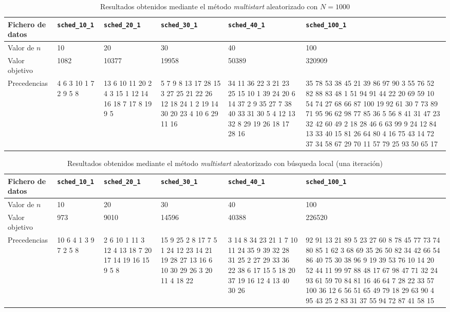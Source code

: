 \documentclass[a4paper,11pt]{article}
\begin{document}
\begin{table}[!htbp]
\label{tb:results_multistart_1000}
\centering\scriptsize
\begin{tabularx}{\textwidth}{|X|X|X|X|X|X|}
\hline
Fichero de datos	& \texttt{sched\_10\_1}	& \texttt{sched\_20\_1}	& \texttt{sched\_30\_1}	& \texttt{sched\_40\_1}	& \texttt{sched\_100\_1}	\\ \hline
Valor de $n$        & 10    & 20    & 30    & 40    & 100   \\ \hline
Valor objetivo      & 1082  & 10377 & 19958 & 50389 & 320909    \\ \hline
Precedencias        & 4 6 3 10 1 7 2 9 5 8  & 13 6 10 11 20 2 4 3 15 1 12 14 16 18 7 17 8 19 9 5    & 5 7 9 8 13 17 28 15 3 27 25 21 22 26 12 18 24 1 2 19 14 30 20 23 4 10 6 29 11 16  & 34 11 36 22 3 21 23 25 15 10 1 39 24 20 6 14 37 2 9 35 27 7 38 40 33 31 30 5 4 12 13 32 8 29 19 26 18 17 28 16    & 35 78 53 38 45 21 39 86 97 90 3 55 76 52 82 88 83 48 1 51 94 91 44 22 20 69 59 10 54 74 27 68 66 87 100 19 92 61 30 7 73 89 71 95 96 62 98 77 85 36 5 56 8 41 31 47 23 32 42 60 49 2 18 28 46 6 63 99 9 24 12 84 13 33 40 15 81 26 64 80 4 16 75 43 14 72 37 34 58 67 29 70 11 57 79 25 93 50 65 17   \\ \hline
\end{tabularx}
\caption{Resultados obtenidos mediante el método \textit{multistart} aleatorizado con ${N=1000}$}
\end{table}

\begin{table}[!htbp]
\label{tb:results_multistart_local_1}
\centering\scriptsize
\begin{tabularx}{\textwidth}{|X|X|X|X|X|X|}
\hline
Fichero de datos	& \texttt{sched\_10\_1}	& \texttt{sched\_20\_1}	& \texttt{sched\_30\_1}	& \texttt{sched\_40\_1}	& \texttt{sched\_100\_1}	\\ \hline
Valor de $n$        & 10    & 20    & 30    & 40    & 100   \\ \hline
Valor objetivo      & 973   & 9010  & 14596 & 40388 & 226520    \\ \hline
Precedencias        & 10 6 4 1 3 9 7 2 5 8  & 2 6 10 1 11 3 12 4 13 18 7 20 17 14 19 16 15 9 5 8    & 15 9 25 2 8 17 7 5 1 24 12 23 14 21 19 28 27 13 16 6 10 30 29 26 3 20 11 4 18 22  & 3 14 8 34 23 21 1 7 10 11 24 35 9 39 32 28 31 25 2 27 29 33 36 22 38 6 17 15 5 18 20 37 19 16 12 4 13 40 30 26    & 92 91 13 21 89 5 23 27 60 8 78 45 77 73 74 80 85 1 62 3 68 69 35 26 50 82 34 42 66 54 86 40 75 30 38 96 9 19 39 53 76 10 14 20 52 44 11 99 97 88 48 17 67 98 47 71 32 24 93 61 59 70 84 81 16 46 64 7 28 22 33 57 100 36 12 6 56 51 65 49 79 18 29 63 90 4 95 43 25 2 83 31 37 55 94 72 87 41 58 15   \\ \hline
\end{tabularx}
\caption{Resultados obtenidos mediante el método \textit{multistart} aleatorizado con búsqueda local (una iteración)}
\end{table}
\end{document}
